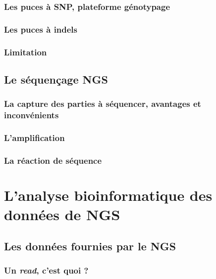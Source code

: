 \documentclass[12pt,twoside]{ugathesis}
\begin{document}
\subsubsection{Les puces à SNP, plateforme
génotypage}\label{les-puces-a-snp-plateforme-genotypage}

\subsubsection{Les puces à indels}\label{les-puces-a-indels}

\subsubsection{Limitation}\label{limitation}

\subsection{Le séquençage NGS}\label{ngs}

\subsubsection{La capture des parties à séquencer, avantages et
inconvénients}\label{la-capture-des-parties-a-sequencer-avantages-et-inconvenients}

\subsubsection{L'amplification}\label{lamplification}

\subsubsection{La réaction de séquence}\label{la-reaction-de-sequence}

\section{L'analyse bioinformatique des données de
NGS}\label{lanalyse-bioinformatique-des-donnees-de-ngs}

\subsection{Les données fournies par le
NGS}\label{les-donnees-fournies-par-le-ngs}

\subsubsection{\texorpdfstring{Un \emph{read}, c'est quoi
?}{Un read, c'est quoi ?}}\label{un-read-cest-quoi}
\end{document}
